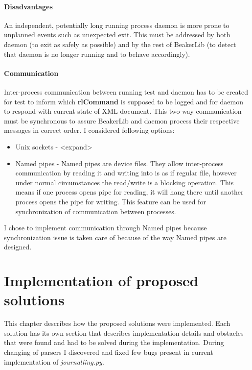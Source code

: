 \subsubsection{Disadvantages}
An independent, potentially long running process daemon is more prone to unplanned events such as unexpected exit. This must be addressed by both daemon (to exit as safely as possible)  and by the rest of BeakerLib (to detect that daemon is no longer running and to behave accordingly). 

\subsubsection{Communication}
Inter-process communication between running test and daemon has to be created for test to inform which \textbf{rlCommand} is supposed to be logged and for daemon to respond with current state of XML document. This two-way communication must be synchronous to assure BeakerLib and daemon process their respective messages in correct order. I considered following options:

\begin{itemize}
\item Unix sockets  -  <expand>
\item Named pipes - Named pipes are device files. They allow inter-process communication by reading it and writing into is as if regular file, however under normal circumstances the read/write is a blocking operation\cite{pipes_blocking}. This means if one process opens pipe for reading, it will hang there until another process opens the pipe for writing. This feature can be used for synchronization of communication between processes. 
\end{itemize}


I chose to implement communication through Named pipes because synchronization issue is taken care of because of the way Named pipes are designed.


\chapter{Implementation of proposed solutions}
\label{implementations}
This chapter describes how the proposed solutions were implemented. Each solution has its own section that describes implementation details and obstacles that were found and had to be solved during the implementation.
During changing of parsers I discovered and fixed few bugs present in current implementation of \textit{journalling.py}.

